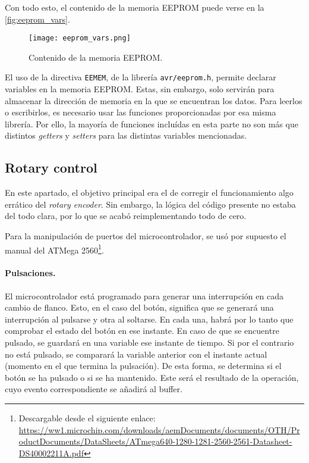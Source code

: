 Con todo esto, el contenido de la memoria EEPROM puede verse en la \autoref{fig:eeprom_vars}.

\begin{figure}
    \centering
    \texttt{[image: eeprom\_vars.png]}
    \caption{Contenido de la memoria EEPROM.}
    \label{fig:eeprom_vars}
\end{figure}

El uso de la directiva \verb|EEMEM|, de la librería \verb|avr/eeprom.h|, permite declarar variables en la memoria EEPROM. Estas, sin embargo, solo servirán para almacenar la dirección de memoria en la que se encuentran los datos. Para leerlos o escribirlos, es necesario usar las funciones proporcionadas por esa misma librería. Por ello, la mayoría de funciones incluídas en esta parte no son más que distintos \textit{getters} y \textit{setters} para las distintas variables mencionadas.

\subsection{Rotary control}

En este apartado, el objetivo principal era el de corregir el funcionamiento algo errático del \textit{rotary encoder}. Sin embargo, la lógica del código presente no estaba del todo clara, por lo que se acabó reimplementando todo de cero.

Para la manipulación de puertos del microcontrolador, se usó por supuesto el manual del ATMega 2560\footnote{Descargable desde el siguiente enlace: \url{https://ww1.microchip.com/downloads/aemDocuments/documents/OTH/ProductDocuments/DataSheets/ATmega640-1280-1281-2560-2561-Datasheet-DS40002211A.pdf}}.


\paragraph{Pulsaciones.} El microcontrolador está programado para generar una interrupción en cada cambio de flanco. Esto, en el caso del botón, significa que se generará una interrupción al pulsarse y otra al soltarse. En cada una, habrá por lo tanto que comprobar el estado del botón en ese instante. En caso de que se encuentre pulsado, se guardará en una variable ese instante de tiempo. Si por el contrario no está pulsado, se comparará la variable anterior con el instante actual (momento en el que termina la pulsación). De esta forma, se determina si el botón se ha pulsado o si se ha mantenido. Este será el resultado de la operación, cuyo evento correspondiente se añadirá al buffer.

